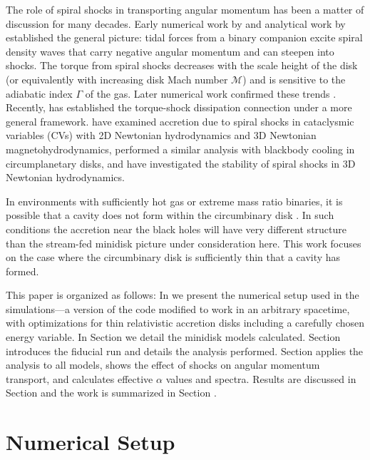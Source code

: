 The role of spiral shocks in transporting angular momentum has been a matter of discussion for many decades.  Early numerical work by \cite{Sawada86} and analytical work by \cite{Spruit87} established the general picture: tidal forces from a binary companion excite spiral density waves that carry negative angular momentum and can steepen into shocks.  The torque from spiral shocks decreases with the scale height of the disk (or equivalently with increasing disk Mach number $\mathcal{M}$) and is sensitive to the adiabatic index $\Gamma$ of the gas.  Later numerical work confirmed these trends \citep{Godon98, Blondin00}.  Recently, \cite{Rafikov16} has established the torque-shock dissipation connection under a more general framework.  \cite{Ju16} have examined accretion due to spiral shocks in cataclysmic variables (CVs) with 2D Newtonian hydrodynamics and 3D Newtonian magnetohydrodynamics, \cite{Zhu16} performed a similar analysis with blackbody cooling in circumplanetary disks, and \cite{Bae16} have investigated the stability of spiral shocks in 3D Newtonian hydrodynamics.

In environments with sufficiently hot gas or extreme mass ratio binaries, it is possible that a cavity does not form within the circumbinary disk \citep{delValle14,delValle15}. In such conditions the accretion near the black holes will have very different structure than the stream-fed minidisk picture under consideration here. This work focuses on the case where the circumbinary disk is sufficiently thin that a cavity has formed.

This paper is organized as follows: In  we present the
numerical setup used in the simulations---a version of the \Disco{} code 
modified to work in an arbitrary spacetime, with optimizations for thin 
relativistic accretion disks including a carefully chosen energy variable.  In Section  we detail the 
minidisk models calculated.  Section  introduces the fiducial run and details the analysis performed.  Section  applies the analysis to all models, shows the effect of shocks on angular momentum transport, and calculates effective $\alpha$ values and spectra. Results are discussed in Section  and the work is summarized in Section .



\section{Numerical Setup} 


